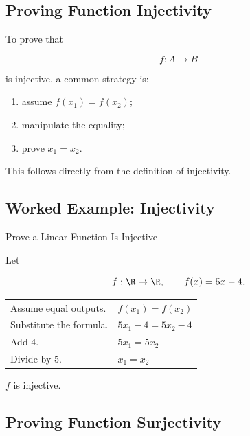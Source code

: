 \subsection{Proving Function Injectivity}
\label{subsec:proof-injectivity}

To prove that

\[ f:A\to B \]

is injective, a common strategy is:

\begin{enumerate}
    \item assume \(f(x_1)=f(x_2)\);
    \item manipulate the equality;
    \item prove \(x_1=x_2\).
\end{enumerate}

This follows directly from the definition of injectivity.

\subsection{Worked Example: Injectivity}
\label{subsec:worked-proof-injectivity}

\begin{workedexamplebox}{Prove a Linear Function Is Injective}

Let

\[ f:\R\to\R,\qquad f(x)=5x-4. \]

\begin{tabularx}{\textwidth}{@{}>{\raggedright\arraybackslash}p{}X@{}}
Assume equal outputs. & \(f(x_1)=f(x_2)\)\\
Substitute the formula. & \(5x_1-4=5x_2-4\)\\
Add \(4\). & \(5x_1=5x_2\)\\
Divide by \(5\). & \(x_1=x_2\)
\end{tabularx}

\begin{answerbox}
\(f\) is injective.
\end{answerbox}
\end{workedexamplebox}

\subsection{Proving Function Surjectivity}
\label{subsec:proof-surjectivity}


